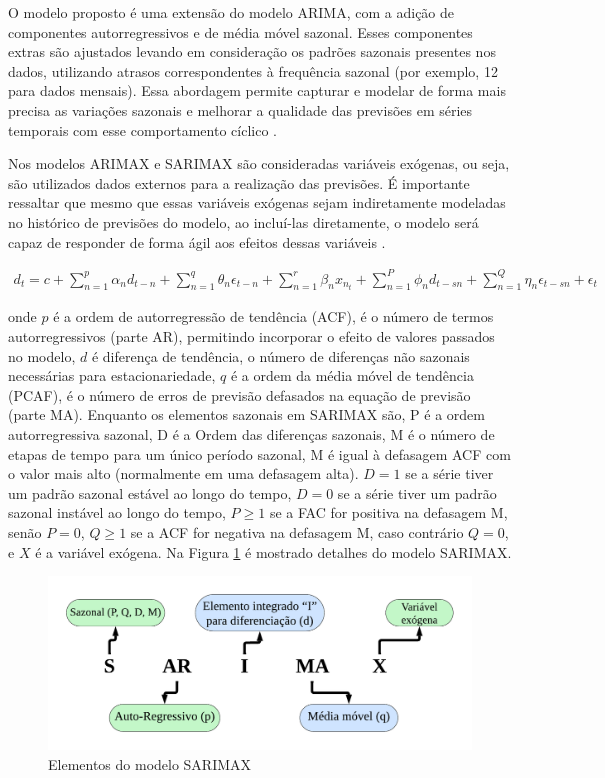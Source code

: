  O modelo proposto é uma extensão do modelo ARIMA, com a adição de componentes autorregressivos e de média móvel sazonal. Esses componentes extras são ajustados levando em consideração os padrões sazonais presentes nos dados, utilizando atrasos correspondentes à frequência sazonal (por exemplo, 12 para dados mensais). Essa abordagem permite capturar e modelar de forma mais precisa as variações sazonais e melhorar a qualidade das previsões em séries temporais com esse comportamento cíclico \cite{sarima}.
 
 Nos modelos ARIMAX e SARIMAX são consideradas variáveis exógenas, ou seja, são utilizados dados externos para a realização das previsões. É importante ressaltar que mesmo que essas variáveis exógenas sejam indiretamente modeladas no histórico de previsões do modelo, ao incluí-las diretamente, o modelo será capaz de responder de forma ágil aos efeitos dessas variáveis \cite{sarima}.
 
 \begin{eqnarray}
 	d_t=c+\sum_{n=1}^p \alpha_n d_{t-n}+\sum_{n=1}^q \theta_n \epsilon_{t-n}+\sum_{n=1}^r \beta_n x_{n_t}+\sum_{n=1}^P \phi_n d_{t-s n}+\sum_{n=1}^Q \eta_n \epsilon_{t-s n}+\epsilon_t \label{eq:sarmax}
 \end{eqnarray}
 
 \noindent onde $p$ é a ordem de autorregressão de tendência (ACF), é o número de termos autorregressivos (parte AR), permitindo incorporar o efeito de valores passados no modelo, $d$ é diferença de tendência, o número de diferenças não sazonais necessárias para estacionariedade, $q$ é a ordem da média móvel de tendência (PCAF), é o número de erros de previsão defasados na equação de previsão (parte MA). Enquanto os elementos sazonais em SARIMAX são, P é a ordem autorregressiva sazonal, D é a Ordem das diferenças sazonais,
 M é o número de etapas de tempo para um único período sazonal, M é igual à defasagem ACF com o valor mais alto (normalmente em uma defasagem alta). $D=1$ se a série tiver um padrão sazonal estável ao longo do tempo, $D=0$ se a série tiver um padrão sazonal instável ao longo do tempo, $P\geq1$ se a FAC for positiva na defasagem M, senão $P=0$, $Q\geq1$ se a ACF for negativa na defasagem M, caso contrário $Q=0$,
 e $X$ é a variável exógena. Na Figura \ref{fig:sarimaxmap} é mostrado detalhes do modelo SARIMAX.
 
 
 \begin{figure}[H]
 	\centering
 	\caption{Elementos do modelo SARIMAX}
 	\label{fig:sarimaxmap}
 	\includegraphics[width=\linewidth]{Modelos/Figuras/sarimax_map.pdf}
 	
 \end{figure}
 

